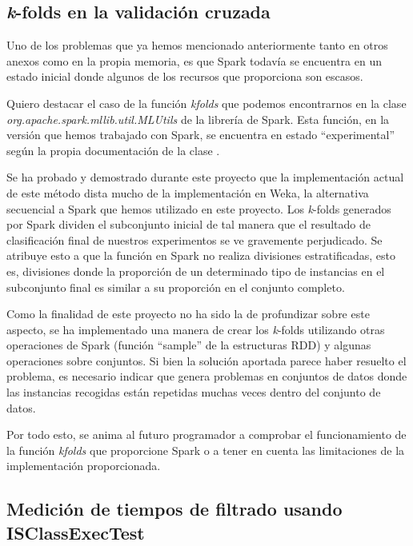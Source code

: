 \subsection{\textit{k}-folds en la validación cruzada}

Uno de los problemas que ya hemos mencionado anteriormente tanto en otros anexos como en la propia memoria, es que Spark todavía se encuentra en un estado inicial donde algunos de los recursos que proporciona son escasos.

Quiero destacar el caso de la función \textit{kfolds} que podemos encontrarnos en la clase \textit{org.apache.spark.mllib.util.MLUtils} de la librería de Spark. Esta función, en la versión que hemos trabajado con Spark, se encuentra en estado ``experimental'' según la propia documentación de la clase \cite{SparkMLUtils}.

Se ha probado y demostrado durante este proyecto que la implementación actual de este método dista mucho de la implementación en Weka, la alternativa secuencial a Spark que hemos utilizado en este proyecto. Los \textit{k}-folds generados por Spark dividen el subconjunto inicial de tal manera que el resultado de clasificación final de nuestros experimentos se ve gravemente perjudicado. Se atribuye esto a que la función en Spark no realiza divisiones estratificadas, esto es, divisiones donde la proporción de un determinado tipo de instancias en el subconjunto final es similar a su proporción en el conjunto completo.

Como la finalidad de este proyecto no ha sido la de profundizar sobre este aspecto, se ha implementado una manera de crear los \textit{k}-folds utilizando otras operaciones de Spark (función ``sample'' de la estructuras RDD) y algunas operaciones sobre conjuntos. Si bien la solución aportada parece haber resuelto el problema, es necesario indicar que genera problemas en conjuntos de datos donde las instancias recogidas están repetidas muchas veces dentro del conjunto de datos.

Por todo esto, se anima al futuro programador a comprobar el funcionamiento de la función \textit{kfolds} que proporcione Spark o a tener en cuenta las limitaciones de la implementación proporcionada.

\subsection{Medición de tiempos de filtrado usando ISClassExecTest} \label{subsec:ISClassExecTest}

